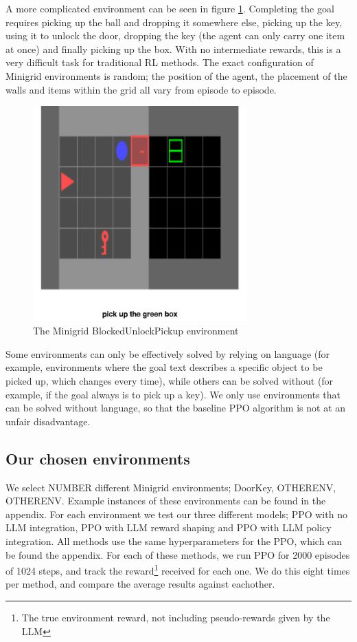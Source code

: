 \documentclass[conference]{IEEEtran}
\begin{document}
A more complicated environment can be seen in figure \ref{blockedunlockpickupenv}. Completing the goal requires picking up the ball and dropping it somewhere else, picking up the key, using it to unlock the door, dropping the key (the agent can only carry one item at once) and finally picking up the box. With no intermediate rewards, this is a very difficult task for traditional RL methods. The exact configuration of Minigrid environments is random; the position of the agent, the placement of the walls and items within the grid all vary from episode to episode.

\begin{figure}[h]
\centerline{\includegraphics[width=3.25in]{figure/blockedunlockpickupenv.png}}
\caption{The Minigrid BlockedUnlockPickup environment}
\label{blockedunlockpickupenv}
\end{figure}

Some environments can only be effectively solved by relying on language (for example, environments where the goal text describes a specific object to be picked up, which changes every time), while others can be solved without (for example, if the goal always is to pick up a key). We only use environments that can be solved without language, so that the baseline PPO algorithm is not at an unfair disadvantage.

\subsection{Our chosen environments}

We select NUMBER different Minigrid environments; DoorKey, OTHERENV, OTHERENV. Example instances of these environments can be found in the appendix. For each environment we test our three different models; PPO with no LLM integration, PPO with LLM reward shaping and PPO with LLM policy integration. All methods use the same hyperparameters for the PPO, which can be found the appendix. For each of these methods, we run PPO for 2000 episodes of 1024 steps, and track the reward\footnote{The true environment reward, not including pseudo-rewards given by the LLM} received for each one. We do this eight times per method, and compare the average results against eachother.
\end{document}
